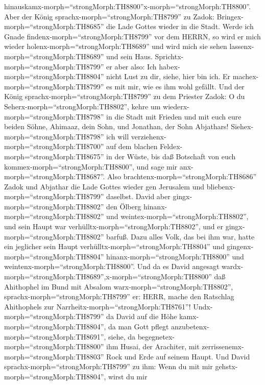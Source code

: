 hinauskamx-morph=``strongMorph:TH8800''x-morph=``strongMorph:TH8800''.
 Aber der König sprachx-morph=``strongMorph:TH8799'' zu
Zadok: Bringex-morph=``strongMorph:TH8685'' die Lade Gottes wieder in
die Stadt. Werde ich Gnade findenx-morph=``strongMorph:TH8799'' vor dem
HERRN, so wird er mich wieder holenx-morph=``strongMorph:TH8689'' und
wird mich sie sehen lassenx-morph=``strongMorph:TH8689'' und sein Haus.
 Sprichtx-morph=``strongMorph:TH8799'' er aber also: Ich
habex-morph=``strongMorph:TH8804'' nicht Lust zu dir, siehe, hier bin
ich. Er machex-morph=``strongMorph:TH8799'' es mit mir, wie es ihm wohl
gefällt.  Und der König
sprachx-morph=``strongMorph:TH8799'' zu dem Priester Zadok: O du
Seherx-morph=``strongMorph:TH8802'', kehre um
wiederx-morph=``strongMorph:TH8798'' in die Stadt mit Frieden und mit
euch eure beiden Söhne, Ahimaaz, dein Sohn, und Jonathan, der Sohn
Abjathars!  Siehex-morph=``strongMorph:TH8798'' ich will
verziehenx-morph=``strongMorph:TH8700'' auf dem blachen
Feldex-morph=``strongMorph:TH8675'' in der Wüste, bis daß Botschaft von
euch kommex-morph=``strongMorph:TH8800'', und sage mir
anx-morph=``strongMorph:TH8687''.  Also
brachtenx-morph=``strongMorph:TH8686'' Zadok und Abjathar die Lade
Gottes wieder gen Jerusalem und bliebenx-morph=``strongMorph:TH8799''
daselbst.  David aber gingx-morph=``strongMorph:TH8802''
den Ölberg hinanx-morph=``strongMorph:TH8802'' und
weintex-morph=``strongMorph:TH8802'', und sein Haupt war
verhülltx-morph=``strongMorph:TH8802'', und er
gingx-morph=``strongMorph:TH8802'' barfuß. Dazu alles Volk, das bei ihm
war, hatte ein jeglicher sein Haupt
verhülltx-morph=``strongMorph:TH8804'' und
gingenx-morph=``strongMorph:TH8804'' hinanx-morph=``strongMorph:TH8800''
und weintenx-morph=``strongMorph:TH8800''.  Und da es David
angesagt
wardx-morph=``strongMorph:TH8689'',x-morph=``strongMorph:TH8800'' daß
Ahithophel im Bund mit Absalom warx-morph=``strongMorph:TH8802'',
sprachx-morph=``strongMorph:TH8799'' er: HERR, mache den Ratschlag
Ahithophels zur Narrheitx-morph=``strongMorph:TH8761''! 
Undx-morph=``strongMorph:TH8799'' da David auf die Höhe
kamx-morph=``strongMorph:TH8804'', da man Gott pflegt
anzubetenx-morph=``strongMorph:TH8691'', siehe, da
begegnetex-morph=``strongMorph:TH8800'' ihm Husai, der Arachiter, mit
zerrissenemx-morph=``strongMorph:TH8803'' Rock und Erde auf seinem
Haupt.  Und David sprachx-morph=``strongMorph:TH8799'' zu
ihm: Wenn du mit mir gehstx-morph=``strongMorph:TH8804'', wirst du mir
